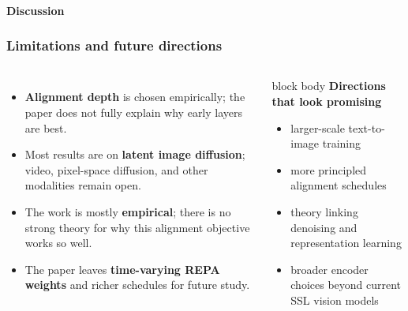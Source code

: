\begin{frame}[t]
  \framesubtitle{Discussion}
  \frametitle{Limitations and future directions}
  \begin{columns}[T,totalwidth=\textwidth]
    \begin{itemize}
      \item \textbf{Alignment depth} is chosen empirically; the paper does not fully explain why early layers are best.
      \item Most results are on \textbf{latent image diffusion}; video, pixel-space diffusion, and other modalities remain open.
      \item The work is mostly \textbf{empirical}; there is no strong theory for why this alignment objective works so well.
      \item The paper leaves \textbf{time-varying REPA weights} and richer schedules for future study.
    \end{itemize}
    \begin{beamercolorbox}[wd=\linewidth,rounded=true,sep=0.22cm]{block body}
      \textbf{Directions that look promising}
      \begin{itemize}
        \item larger-scale text-to-image training
        \item more principled alignment schedules
        \item theory linking denoising and representation learning
        \item broader encoder choices beyond current SSL vision models
      \end{itemize}
    \end{beamercolorbox}
  \end{columns}
\end{frame}

